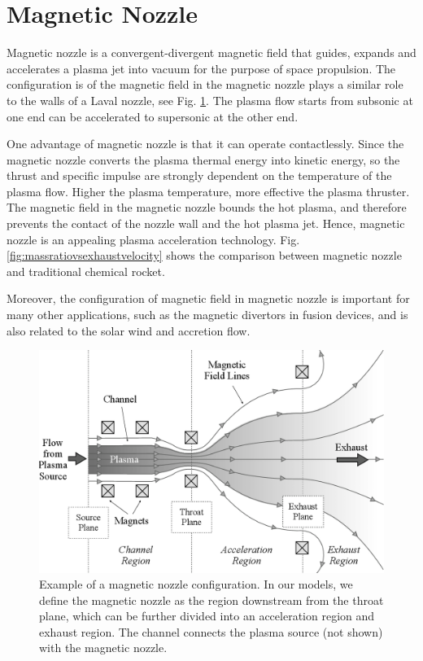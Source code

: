 \section{Magnetic Nozzle}
Magnetic nozzle is a convergent-divergent magnetic field that guides, expands and accelerates a plasma jet into vacuum for the purpose of space propulsion. \cite{andersen_continuous_1969,boswell_experimental_2004,williams_fusion_2003} The configuration is of the magnetic field in the magnetic nozzle plays a similar role to the walls of a Laval nozzle, see Fig. \ref{fig:magnetic-nozzle}. The plasma flow starts from subsonic at one end can be accelerated to supersonic at the other end. 

One advantage of magnetic nozzle is that it can operate contactlessly. Since the magnetic nozzle converts the plasma thermal energy into kinetic energy, so the thrust and specific impulse are strongly dependent on the temperature of the plasma flow. Higher the plasma temperature, more effective the plasma thruster. The magnetic field in the magnetic nozzle bounds the hot plasma, and therefore prevents the contact of the nozzle wall and the hot plasma jet. Hence, magnetic nozzle is an appealing plasma acceleration technology. Fig. \ref{fig:massratiovsexhaustvelocity} shows the comparison between magnetic nozzle and traditional chemical rocket.

Moreover, the configuration of magnetic field in magnetic nozzle is important for many other applications,\cite{smolyakov_quasineutral_2021} such as the magnetic divertors in fusion devices,\cite{ryutov_divertor_2016,togo_characteristics_2019} and is also related to the solar wind and accretion flow.\cite{jockers_stability_1968,aikawa_stability_1979} 

\begin{figure}[H]
	\centering
	\includegraphics[width=0.7\linewidth]{img/introduction/magnetic_nozzle}
	\caption{Example of a magnetic nozzle configuration. In our models, we define the magnetic nozzle as the region downstream from the throat plane, which can be further divided into an acceleration region and exhaust region. The channel connects the plasma source (not shown) with the magnetic nozzle. \cite{little_performance_2015}}
	\label{fig:magnetic-nozzle}
\end{figure}


